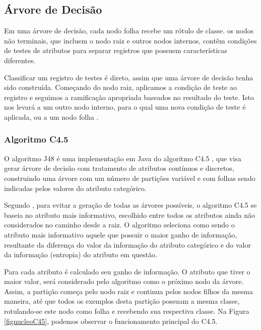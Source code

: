 \documentclass[
	12pt,				%
	openright,			%
	oneside,	
	a4paper,				%
	english,				%
	brazil				%
]{abntex2/abntex2} %
\begin{document}
	\vspace{-1.5\baselineskip}
	\subsection{Árvore de Decisão}
	\vspace{1\baselineskip}
		Em uma árvore de decisão, cada nodo folha recebe um rótulo de classe. os nodos não terminais, que incluem o nodo raiz e outros nodos internos, contêm condições de testes de atributos para separar registros que possuem características diferentes.
		
		Classificar um registro de testes é direto, assim que uma árvore de decisão tenha sido construída. Começando do nodo raiz, aplicamos a condição de teste ao registro e seguimos a ramificação apropriada baseados no resultado do teste. Isto nos levará a um outro nodo interno, para o qual uma nova condição de teste é aplicada, ou a um nodo folha \cite{tan:2009}.
	\vspace{-1.5\baselineskip}
	\subsubsection{Algoritmo C4.5}
	\vspace{1\baselineskip}
	O algoritmo J48 \cite{weka:2015} é uma implementação em Java \cite{oracle:2015} do algoritmo C4.5 \cite{quinlan:94}, que visa gerar árvore de decisão com tratamento de atributos contínuos e discretos, construindo uma árvore com um número de partições variável e com folhas sendo indicadas pelos valores do atributo categórico. 
	
	Segundo \cite{halmenschlager:2002}, para evitar a geração de todas as árvores possíveis, o algoritmo C4.5 se baseia no atributo mais informativo, escolhido entre todos os atributos ainda não considerados no caminho desde a raiz. O algoritmo seleciona como sendo o atributo mais informativo aquele que possuir o maior ganho de informação, resultante da diferença do valor da informação do atributo categórico e do valor da informação (entropia) do atributo em questão.
	
	Para cada atributo é calculado seu ganho de informação. O atributo que tiver o maior valor, será considerado pelo algoritmo como o próximo nodo da árvore. Assim, a partição começa pelo nodo raiz e continua pelos nodos filhos da mesma maneira, até que todos os exemplos desta partição possuam a mesma classe, rotulando-se este nodo como folha e recebendo sua respectiva classe. Na Figura \ref{fignucleoC45}, podemos observar o funcionamento principal do C4.5.
	
\end{document}
